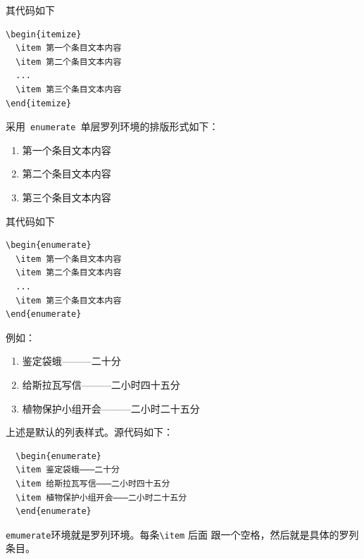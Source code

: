 其代码如下
\begin{verbatim}
\begin{itemize}
  \item 第一个条目文本内容
  \item 第二个条目文本内容
  ...
  \item 第三个条目文本内容
\end{itemize}
\end{verbatim}

采用~\verb|enumerate|~单层罗列环境的排版形式如下：
\begin{enumerate}
  \item 第一个条目文本内容
  \item 第二个条目文本内容
  \item 第三个条目文本内容
\end{enumerate}

其代码如下
\begin{verbatim}
\begin{enumerate}
  \item 第一个条目文本内容
  \item 第二个条目文本内容
  ...
  \item 第三个条目文本内容
\end{enumerate}
\end{verbatim}

例如：

\begin{enumerate}
  \item 鉴定袋蛾———二十分
  \item 给斯拉瓦写信———二小时四十五分
  \item 植物保护小组开会———二小时二十五分
\end{enumerate}

上述是默认的列表样式。源代码如下：
\begin{lstlisting}
  \begin{enumerate}
  \item 鉴定袋蛾———二十分
  \item 给斯拉瓦写信———二小时四十五分
  \item 植物保护小组开会———二小时二十五分
  \end{enumerate}
\end{lstlisting}

\texttt{emumerate}环境就是罗列环境。每条\verb|\item| 后面
跟一个空格，然后就是具体的罗列条目。

